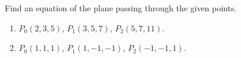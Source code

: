 Find an equation of the plane passing through the given points.

\begin{enumerate}
\item $P_0(2,3,5) $, $P_1(3,5,7)$, $P_2(5,7,11)$.
\item $P_0(1,1,1)$, $P_1(1,-1,-1)$, $P_2(-1,-1,1)$.
\end{enumerate}